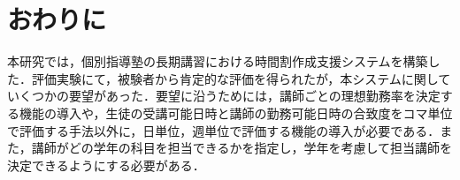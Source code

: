 \chapter{おわりに}
本研究では，個別指導塾の長期講習における時間割作成支援システムを構築した．評価実験にて，被験者から肯定的な評価を得られたが，本システムに関していくつかの要望があった．要望に沿うためには，講師ごとの理想勤務率を決定する機能の導入や，生徒の受講可能日時と講師の勤務可能日時の合致度をコマ単位で評価する手法以外に，日単位，週単位で評価する機能の導入が必要である．また，講師がどの学年の科目を担当できるかを指定し，学年を考慮して担当講師を決定できるようにする必要がある．